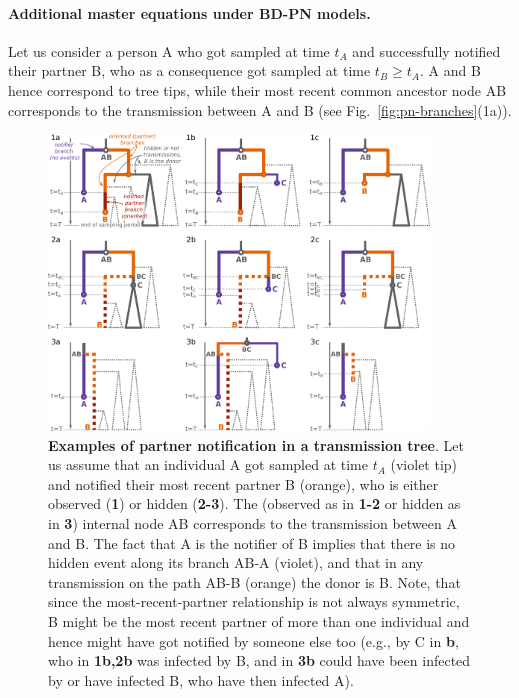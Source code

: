 \documentclass[10pt,letterpaper]{article}
\begin{document}
\paragraph{Additional master equations under BD-PN models.}

Let us consider a person A who got sampled at time $t_A$ and successfully notified their partner B, who as a consequence got sampled at time $t_B \geq t_A$. A and B hence correspond to tree tips, while their most recent common ancestor node AB corresponds to the transmission between A and B (see Fig.~\ref{fig:pn-branches}(1a)).



\begin{figure}[h!]
\centering 
\includegraphics[width=0.9\textwidth]{Fig_PNbranches}
\caption{\textbf{Examples of partner notification in a transmission tree}. Let us assume that an individual A got sampled at time $t_A$ (violet tip) and notified their most recent partner B (orange), who is either observed (\textbf{1}) or hidden (\textbf{2-3}).
The (observed as in \textbf{1-2} or hidden as in \textbf{3}) internal node AB corresponds to the transmission between A and B. 
The fact that A is the notifier of B implies that there is no hidden event along its branch AB-A (violet), and that in any transmission on the path AB-B (orange) the donor is B. 
Note, that since the most-recent-partner relationship is not always symmetric, B might be the most recent partner of more than one individual and hence might have got notified by someone else too (e.g., by C in \textbf{b}, who in \textbf{1b,2b} was infected by B, and in \textbf{3b} could have been infected by or have infected B, who have then infected A). 
}
\end{figure}
\end{document}
